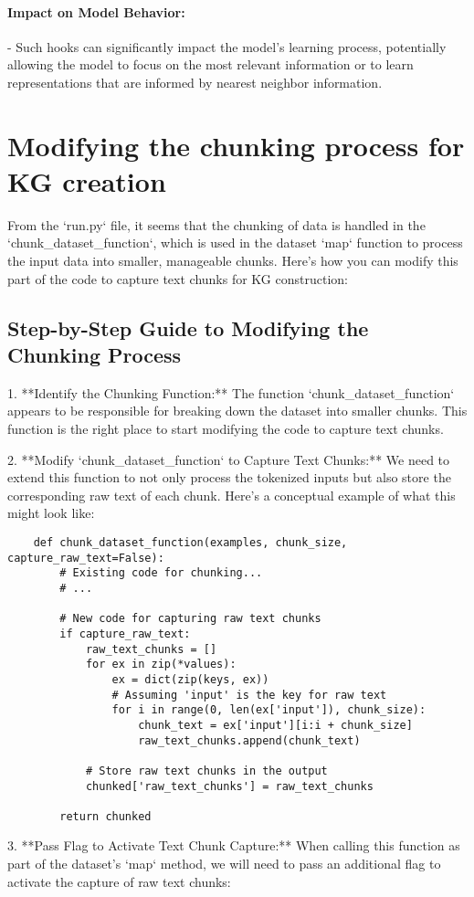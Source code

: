 \documentclass[12pt]{article}
\begin{document}
\paragraph{Impact on Model Behavior:}
- Such hooks can significantly impact the model's learning process,
potentially allowing the model to focus on the most relevant information or
to learn representations that are informed by nearest neighbor information.


\section*{Modifying the chunking process for KG creation}
From the `run.py` file, it seems that the chunking of data is handled in the `chunk\_dataset\_function`, which is used in the dataset `map` function to process the input data into smaller, manageable chunks. Here's how you can modify this part of the code to capture text chunks for KG construction:

\subsection*{Step-by-Step Guide to Modifying the Chunking Process}

1. **Identify the Chunking Function:**
The function `chunk\_dataset\_function` appears to be responsible for breaking
down the dataset into smaller chunks. This function is the right place to start
modifying the code to capture text chunks.

2. **Modify `chunk\_dataset\_function` to Capture Text Chunks:**
We need to extend this function to not only process the tokenized inputs but
also store the corresponding raw text of each chunk. Here's a conceptual
example of what this might look like:

   \begin{lstlisting}
    def chunk_dataset_function(examples, chunk_size, capture_raw_text=False):
        # Existing code for chunking...
        # ...

        # New code for capturing raw text chunks
        if capture_raw_text:
            raw_text_chunks = []
            for ex in zip(*values):
                ex = dict(zip(keys, ex))
                # Assuming 'input' is the key for raw text
                for i in range(0, len(ex['input']), chunk_size):
                    chunk_text = ex['input'][i:i + chunk_size]
                    raw_text_chunks.append(chunk_text)

            # Store raw text chunks in the output
            chunked['raw_text_chunks'] = raw_text_chunks

        return chunked
   \end{lstlisting}
   3. **Pass Flag to Activate Text Chunk Capture:** When calling this function
   as part of the dataset's `map` method, we will need to pass an additional
   flag to activate the capture of raw text chunks:
\end{document}
